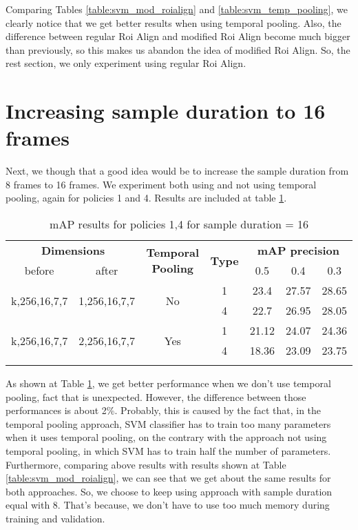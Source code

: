Comparing Tables \ref{table:svm_mod_roialign} and \ref{table:svm_temp_pooling}, we clearly notice that we get better results when
using temporal pooling. Also, the difference between regular Roi Align and modified Roi Align become much bigger than previously,
so this makes us abandon the idea of modified Roi Align. So, the rest section, we only experiment using regular Roi Align.

\section{Increasing sample duration to 16 frames}

Next, we though that a good idea would be to increase the sample duration from 8 frames to 16 frames. We experiment both using and not
using temporal pooling, again for policies 1 and 4. Results are included at table \ref{table:svm_temp_pooling_16}. 

\begin{center}
\begin{longtable}{||c | c| c| c||c c c||}

  \hline
 \multicolumn{2}{||c|}{\textbf{Dimensions}} & \multirow{2}{4.5em}{\textbf{Temporal Pooling}} &\multirow{2}{*}{ \textbf{Type}} &\multicolumn{3}{|c||}{\textbf{mAP precision}}\\

  before & after & {} & {} &  0.5 &  0.4 & 0.3 \\
  \hline   \hline

  \multirow{2}{*}{k,256,16,7,7} & \multirow{2}{*}{1,256,16,7,7} & \multirow{2}{*}{No}  & 1 & 23.4 & 27.57 &28.65  \\
  \cline{4-7}
  {} & {} & {} & 4 & 22.7 & 26.95 & 28.05 \\
  \hline

  \multirow{2}{*}{k,256,16,7,7} & \multirow{2}{*}{2,256,16,7,7} & \multirow{2}{*}{Yes}  & 1 & 21.12 & 24.07 & 24.36  \\
  \cline{4-7}
  {} & {} & {} & 4 & 18.36 & 23.09 & 23.75 \\
  \hline
  \caption{mAP results for  policies 1,4  for sample duration = 16 }
  \label{table:svm_temp_pooling_16}
\end{longtable} 
\end{center}

As shown at Table \ref{table:svm_temp_pooling_16}, we get better performance when we don't use temporal pooling, fact that is unexpected.
However, the difference between those performances is about 2\%. Probably, this is caused by the fact that, in the temporal pooling approach,
SVM classifier has to train too many parameters when it uses temporal pooling, on the contrary with the approach not using temporal pooling,
in which SVM has to train half the number of parameters. Furthermore, comparing above results with results shown at Table  \ref{table:svm_mod_roialign}, we can see that we get about the same results for both approaches. So, we choose to keep using approach with sample duration equal
with 8. That's because, we don't have to use too much memory during training and validation.


